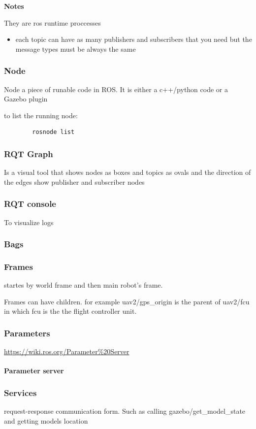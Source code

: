 \documentclass{book}
\providecommand{\ProjectDeepHeading}[2]{%
    \par\medskip\noindent\textbf{#2}\par\smallskip
}
\begin{document}
    \ProjectDeepHeading{1}{Notes}
        They are ros runtime proccesses
        \begin{itemize}
            \item each topic can have as many publishers and subscribers that you need but the message types must be always the same
        \end{itemize}
\subsubsection{Node}
    Node a piece of runable code in ROS. It is either a c++/python code or a Gazebo plugin

    to list the running node:
    \begin{verbatim}
        rosnode list
    \end{verbatim}
\subsubsection{RQT Graph}
    Is a visual tool that shows nodes as boxes and topics as ovals and the direction of the edges show publisher and subscriber nodes
\subsubsection{RQT console}
    To visualize logs
\subsubsection{Bags}
\subsubsection{Frames}
     startes by world frame and then main robot's frame.
    
    Frames can have children. for example uav2/gps\_origin is the parent of uav2/fcu in which fcu is the the flight controller unit.
\subsubsection{Parameters}
    \url{https://wiki.ros.org/Parameter%20Server}
    \paragraph{Parameter server}
\subsubsection{Services}
    request-response communication form. Such as calling gazebo/get\_model\_state and getting models location
\end{document}
